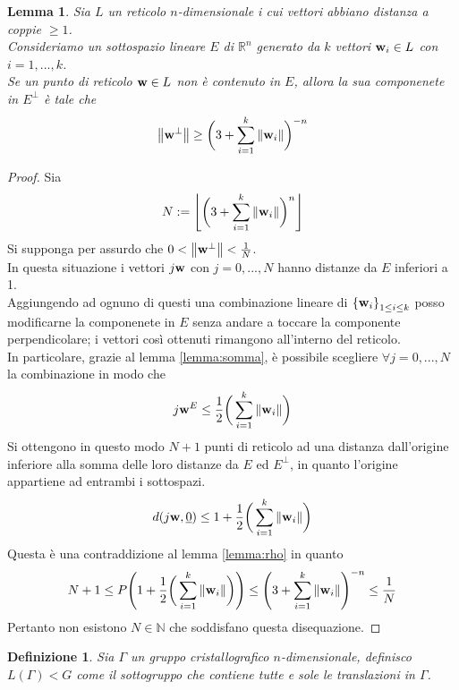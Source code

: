 \documentclass[a4paper,11pt,openright,twoside	]{book}
\newtheorem{definition}{Definizione}[section]
\newtheorem{lemma}[theorem]{Lemma}
\begin{document}
\begin{lemma}
\label{lemma:somma2}
Sia $L$ un reticolo $n$-dimensionale i cui vettori abbiano distanza a coppie $\geq 1$. \\ Consideriamo un sottospazio lineare $E$ di $\mathbb{R}^n$ generato da $k$ vettori $\vb{w}_i \in L$ con $i = 1,... ,k$. \\
Se un punto di reticolo $\vb{w} \in L$ non è contenuto in $E$, allora la sua componenete in $E^{\perp}$ è tale che 
\[ \norm{\vb{w}^{\perp}} \geq \bigg( 3 +  \sum_{i = 1}^{k} \norm{\vb{w}_i} \bigg)^{-n} \]
\end{lemma}

\begin{proof}
Sia \[ N := \left\lfloor
\bigg( 3 +  \sum_{i = 1}^{k} \norm{\vb{w}_i} \bigg)^{n}
\right\rfloor\]
Si supponga per assurdo che $0 < \norm{\vb{w}^{\perp}}  < \frac{1}{N}$. \\
In questa situazione i vettori $j \vb{w}$ con $j = 0, ..., N$ hanno distanze da $E$ inferiori a 1. \\
Aggiungendo ad ognuno di questi una combinazione lineare di ${\{\vb{w}_i\}}_{1 \leq i \leq k }$ posso modificarne la componenete in $E$ senza andare a toccare la componente perpendicolare; i vettori così ottenuti rimangono all'interno del reticolo. \\
In particolare, grazie al lemma \ref{lemma:somma}, è possibile scegliere $\forall j = 0, ..., N$ la combinazione in modo che \[ j \vb{w}^{E} \leq \frac{1}{2} \bigg( \sum_{i = 1}^{k} \norm{\vb{w}_i} \bigg)  \]  
Si ottengono in questo modo $N+1$ punti di reticolo ad una distanza dall'origine inferiore alla somma delle loro distanze da $E$ ed $E^{\perp}$, in quanto l'origine appartiene ad entrambi i sottospazi.
\[ d(j\vb{w}, \underline{0} ) \leq 1 + \frac{1}{2} \bigg( \sum_{i = 1}^{k} \norm{\vb{w}_i} \bigg) \]
Questa è una contraddizione al lemma \ref{lemma:rho} in quanto 
\[ N+1 \leq P \Bigg( 1 + \frac{1}{2} \bigg( \sum_{i = 1}^{k} \norm{\vb{w}_i} \bigg) \Bigg)  \leq \Bigg( 3 +  \sum_{i = 1}^{k} \norm{\vb{w}_i} \Bigg)^{-n} \leq  \frac{1}{N} \]
Pertanto non esistono $N \in \mathbb{N}$ che soddisfano questa disequazione.
\end{proof}


\begin{definition}
Sia $\Gamma$ un gruppo cristallografico $n$-dimensionale, definisco $L(\Gamma)<G$ come il sottogruppo che contiene tutte e sole le translazioni in $\Gamma$.
\end{definition}
\end{document}

